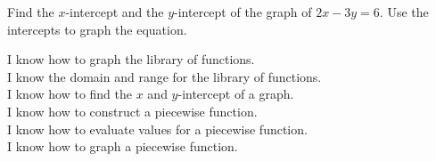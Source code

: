\documentclass[oneside,10pt]{book}
\begin{document}
\newpage



\example
Find the $x$-intercept and the $y$-intercept of the graph of
$2x-3y=6$.
Use the intercepts to graph the equation.

\vfill







\begin{goals}
I know how to graph the library of functions.  \\
I know the domain and range for the library of functions. \\
I know how to find the $x$ and $y$-intercept of a graph. \\
I know how to construct a piecewise function. \\
I know how to evaluate values for a piecewise function. \\
I know how to graph a piecewise function. \\
\end{goals}
\end{document}
